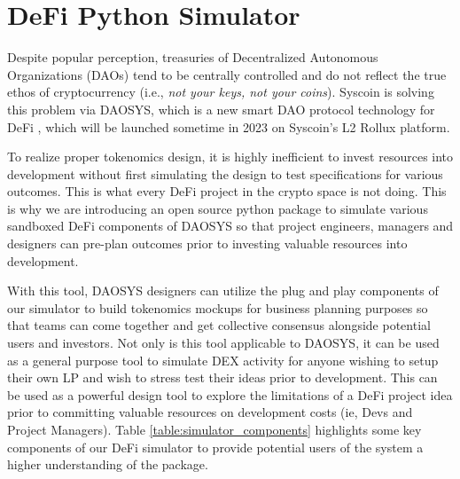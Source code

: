 \documentclass[journal,twocolumn,12pt]{ieeesyscoin}
\begin{document}
\section{DeFi Python Simulator}
\label{sec:python_simulator}

Despite popular perception, treasuries of Decentralized Autonomous Organizations (DAOs) tend to be centrally controlled and do not reflect the true ethos of cryptocurrency (i.e., \textit{not your keys, not your coins}). Syscoin is solving this problem via DAOSYS, which is a new smart DAO protocol technology for DeFi \cite{Doge22}, which will be launched sometime in 2023 on Syscoin's L2 Rollux platform.

To realize proper tokenomics design, it is highly inefficient to invest resources into development without first simulating the design to test specifications for various outcomes. This is what every DeFi project in the crypto space is not doing. This is why we are introducing an open source python package to simulate various sandboxed DeFi components of DAOSYS so that project engineers, managers and designers can pre-plan outcomes prior to investing valuable resources into development. 

With this tool, DAOSYS designers can utilize the plug and play components of our simulator to build tokenomics mockups for business planning purposes so that teams can come together and get collective consensus alongside potential users and investors. Not only is this tool applicable to DAOSYS, it can be used as a general purpose tool to simulate DEX activity for anyone wishing to setup their own LP and wish to stress test their ideas prior to development. This can be used as a powerful design tool to explore the limitations of a DeFi project idea prior to committing valuable resources on development costs (ie, Devs and Project Managers). Table \ref{table:simulator_components} highlights some key components of our DeFi simulator to provide potential users of the system a higher understanding of the package.
\end{document}
